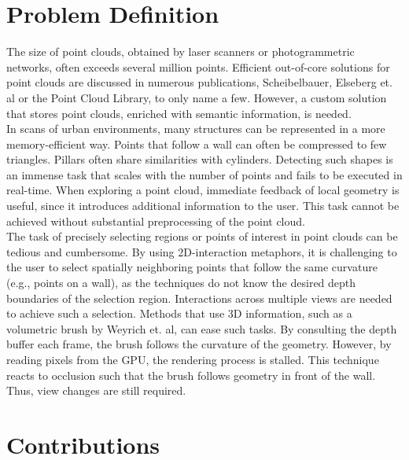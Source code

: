 \section{Problem Definition}

The size of point clouds, obtained by laser scanners or photogrammetric networks, often exceeds several million points. 
Efficient out-of-core solutions for point clouds are discussed in numerous publications, Scheibelbauer\cite{scheiblauer-thesis}, Elseberg et. al\cite{elseberg2013one} or the Point Cloud Library\cite{rusu20113d}, to only name a few. However, a custom solution that stores point clouds, enriched with semantic information, is needed.
\\
In scans of urban environments, many structures can be represented in a more memory-efficient way. Points that follow a wall can often be compressed to few triangles. Pillars often share similarities with cylinders. Detecting such shapes is an immense task that scales with the number of points and fails to be executed in real-time. When exploring a point cloud, immediate feedback of local geometry is useful, since it introduces additional information to the user. This task cannot be achieved without substantial preprocessing of the point cloud. 
\\
The task of precisely selecting regions or points of interest in point clouds can be tedious and cumbersome. By using 2D-interaction metaphors, it is challenging to the user to select spatially neighboring points that follow the same curvature (e.g., points on a wall), as the techniques do not know the desired depth boundaries of the selection region. Interactions across multiple views are needed to achieve such a selection.  Methods that use 3D information, such as a volumetric brush by Weyrich et. al\cite{weyrich2004post}, can ease such tasks. By consulting the depth buffer each frame, the brush follows the curvature of the geometry. However, by reading pixels from the GPU, the rendering process is stalled. This technique reacts to occlusion such that the brush follows geometry in front of the wall. Thus, view changes are still required.


\section{Contributions}

